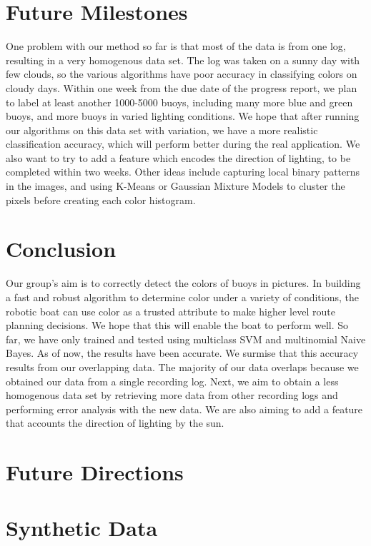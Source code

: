 \documentclass{article} %
\begin{document}
\section{Future Milestones}

One problem with our method so far is that most of the data is from one log, resulting in a very homogenous data set. The log was taken on a sunny day with few clouds, so the various algorithms have poor accuracy in classifying colors on cloudy days. Within one week from the due date of the progress report, we plan to label at least another 1000-5000 buoys, including many more blue and green buoys, and more buoys in varied lighting conditions. We hope that after running our algorithms on this data set with variation, we have a more realistic classification accuracy, which will perform better during the real application. We also want to try to add a feature which encodes the direction of lighting, to be completed within two weeks. Other ideas include capturing local binary patterns in the images, and using K-Means or Gaussian Mixture Models to cluster the pixels before creating each color histogram.

\section{Conclusion}

Our group's aim is to correctly detect the colors of buoys in pictures. In building a fast and robust algorithm to determine color under a variety of conditions, the robotic boat can use color as a trusted attribute to make higher level route planning decisions. We hope that this will enable the boat to perform well. So far, we have only trained and tested using multiclass SVM and multinomial Naive Bayes. As of now, the results have been accurate. We surmise that this accuracy results from our overlapping data. The majority of our data overlaps because we obtained our data from a single recording log.  Next, we aim to obtain a less homogenous data set by retrieving more data from other recording logs and performing error analysis with the new data. We are also aiming to add a feature that accounts the direction of lighting by the sun.

\section{Future Directions}



\section{Synthetic Data}
\end{document}
